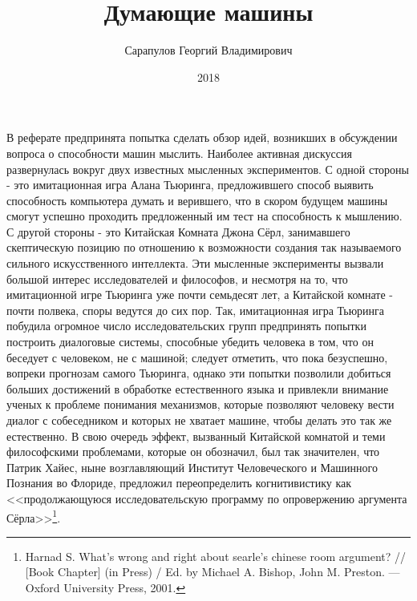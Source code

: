 \documentclass[12pt, specialist, subf, substylefile = spbu.rtx]{disser}
\begin{document}

\title{Думающие машины}


\author{Сарапулов Георгий Владимирович}


\date{2018}

\maketitle


\tableofcontents

\intro
В реферате предпринята попытка сделать обзор идей, возникших в обсуждении вопроса о способности машин мыслить. Наиболее активная дискуссия развернулась вокруг двух известных мысленных экспериментов. С одной стороны - это имитационная игра Алана Тьюринга, предложившего способ выявить способность компьютера думать и верившего, что в скором будущем машины смогут успешно проходить предложенный им тест на способность к мышлению. С другой стороны - это Китайская Комната Джона Сёрл, занимавшего скептическую позицию по отношению к возможности создания так называемого сильного искусственного интеллекта. Эти мысленные эксперименты вызвали большой интерес исследователей и философов, и несмотря на то, что имитационной игре Тьюринга уже почти семьдесят лет, а Китайской комнате - почти полвека, споры ведутся до сих пор. Так, имитационная игра Тьюринга побудила огромное число исследовательских групп предпринять попытки построить диалоговые системы, способные убедить человека в том, что он беседует с человеком, не с машиной; следует отметить, что пока безуспешно, вопреки прогнозам самого Тьюринга, однако эти попытки позволили добиться больших достижений в обработке естественного языка и привлекли внимание ученых к проблеме понимания механизмов, которые позволяют человеку вести диалог с собеседником и которых не хватает машине, чтобы делать это так же естественно. В свою очередь эффект, вызванный Китайской комнатой и теми философскими проблемами, которые он обозначил, был так значителен, что Патрик Хайес, ныне возглавляющий Институт Человеческого и Машинного Познания во Флориде, предложил переопределить когнитивистику как <<продолжающуюся исследовательскую программу по опровержению аргумента Сёрла>>\footnote{\cite{Harnad2001-HARWWA} Harnad S. What’s wrong and right about searle’s chinese room argument? // [Book Chapter] (in Press) / Ed. by Michael A. Bishop, John M. Preston. — Oxford University Press, 2001.}.
\end{document}

